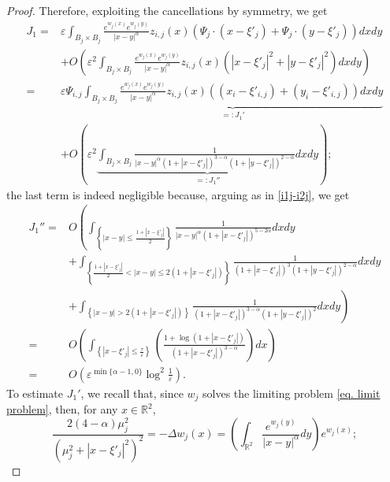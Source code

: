 \documentclass[10pt,a4paper]{amsart}
\begin{document}
\begin{proof}
Therefore, exploiting the cancellations by symmetry, we get
\begin{align*}
J_1=&\varepsilon\int_{B_j\times B_j}\frac{e^{w_j(x)}e^{w_j(y)}}{|x-y|^\alpha}z_{i,j}(x)\left(\Psi_j\cdot\left(x-\xi'_j\right)+\Psi_j\cdot\left(y-\xi'_j\right)\right)dxdy\\
&+O\left(\varepsilon^2\int_{B_j\times B_j}\frac{e^{w_j(x)}e^{w_j(y)}}{|x-y|^\alpha}z_{i,j}(x)\left(\left|x-\xi'_j\right|^2+\left|y-\xi'_j\right|^2\right)dxdy\right)\\
=&\varepsilon\Psi_{i,j}\underbrace{\int_{B_j\times B_j}\frac{e^{w_j(x)}e^{w_j(y)}}{|x-y|^\alpha}z_{i,j}(x)\left(\left(x_i-\xi'_{i,j}\right)+\left(y_i-\xi'_{i,j}\right)\right)dxdy}_{=:J_1'}\\
&+O\left(\varepsilon^2\underbrace{\int_{B_j\times B_j}\frac1{|x-y|^\alpha\left(1+\left|x-\xi'_j\right|\right)^{3-\alpha}\left(1+\left|y-\xi'_j\right|\right)^{2-\alpha}}dxdy}_{=:J_1''}\right);
\end{align*}
the last term is indeed negligible because, arguing as in \eqref{i1j-i2j}, we get
\begin{align*}
J_1''=&O\left(\int_{\left\{|x-y|\le\frac{1+\left|x-\xi'_j\right|}2\right\}}\frac1{|x-y|^\alpha\left(1+\left|x-\xi'_j\right|\right)^{5-2\alpha}}dxdy\right.\\
&\left.+\int_{\left\{\frac{1+\left|x-\xi'_j\right|}2<|x-y|\le2\left(1+\left|x-\xi'_j\right|\right)\right\}}\frac1{\left(1+\left|x-\xi'_j\right|\right)^3\left(1+\left|y-\xi'_j\right|\right)^{2-\alpha}}dxdy\right.\\
&\left.+\int_{\left\{|x-y|>2\left(1+\left|x-\xi'_j\right|\right)\right\}}\frac1{\left(1+\left|x-\xi'_j\right|\right)^{3-\alpha}\left(1+\left|y-\xi'_j\right|\right)^2}dxdy\right)\\
=&O\left(\int_{\left\{\left|x-\xi'_j\right|\le\frac\tau\varepsilon\right\}}\left(\frac{1+\log\left(1+\left|x-\xi'_j\right|\right)}{\left(1+\left|x-\xi'_j\right|\right)^{3-\alpha}}\right)dx\right)\\
=&O\left(\varepsilon^{\min\{\alpha-1,0\}}\log^2\frac1\varepsilon\right).
\end{align*}
To estimate $J_1'$, we recall that, since $w_j$ solves the limiting problem \eqref{eq. limit problem}, then, for any $x\in\mathbb R^2$,
\begin{equation}\label{eqbubble}
\frac{2(4-\alpha)\mu_j^2}{\left(\mu_j^2+\left|x-\xi'_j\right|^2\right)^2}=-\Delta w_j(x)=\left(\int_{\mathbb R^2}\frac{e^{w_j(y)}}{|x-y|^\alpha}dy\right)e^{w_j(x)};
\end{equation}

\end{proof}
\end{document}
